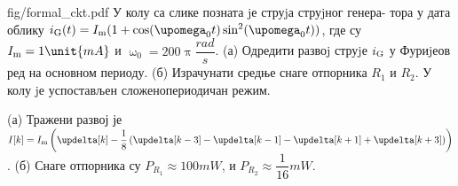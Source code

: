 \begin{slikaDesno}[1.2]{fig/formal_ckt.pdf}
    \PID 
    У колу са слике позната jе струjа струjног генера-
    тора у дата облику 
    $i_{\rm G}(t) = I_{\rm m} (1 + \cos(\upomega_0 t) \sin^2(\upomega_0 t))$,
    где су $I_{\rm m} = 1\unit{mA}$ и $\upomega_0 = 200\uppi \unit{\dfrac{rad}{s}}$.
    (а) Одредити развоj струjе $i_{\rm G}$ у Фуриjеов ред на основном периоду.
    (б) Израчунати средње снаге отпорника $R_1$ и $R_2$. У 
    колу jе успостављен сложенопериодичан режим.
\end{slikaDesno}

\REZULTAT

(а) Тражени развој је 
$I[k] = I_{\rm m} \left(
    \updelta[k] - \dfrac{1}{8}\left(
        \updelta[k-3] - \updelta[k-1] - \updelta[k+1] + \updelta[k+3]
    \right)
\right)$. (б) Снаге отпорника су 
$P_{R_1} \approx 100\unit{mW}$, и 
$P_{R_2} \approx \dfrac{1}{16}\unit{mW}$.